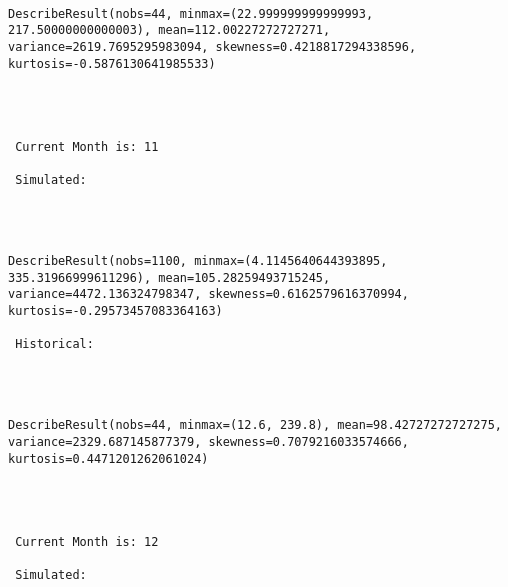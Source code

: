 \documentclass[11pt]{article}
\begin{document}
    \begin{center}
    \end{center}
    { \hspace*{\fill} \\}
    
    \begin{Verbatim}[commandchars=\\\{\}]
DescribeResult(nobs=44, minmax=(22.999999999999993, 217.50000000000003), mean=112.00227272727271, variance=2619.7695295983094, skewness=0.4218817294338596, kurtosis=-0.5876130641985533) 



 
 Current Month is: 11

 Simulated: 
 

    \end{Verbatim}

    \begin{center}
    \end{center}
    { \hspace*{\fill} \\}
    
    \begin{Verbatim}[commandchars=\\\{\}]
DescribeResult(nobs=1100, minmax=(4.1145640644393895, 335.31966999611296), mean=105.28259493715245, variance=4472.136324798347, skewness=0.6162579616370994, kurtosis=-0.29573457083364163)

 Historical: 
 

    \end{Verbatim}

    \begin{center}
    \end{center}
    { \hspace*{\fill} \\}
    
    \begin{Verbatim}[commandchars=\\\{\}]
DescribeResult(nobs=44, minmax=(12.6, 239.8), mean=98.42727272727275, variance=2329.687145877379, skewness=0.7079216033574666, kurtosis=0.4471201262061024) 



 
 Current Month is: 12

 Simulated: 
 

    \end{Verbatim}
\end{document}
